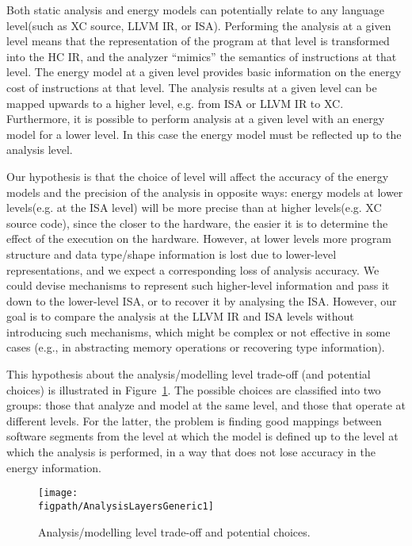 \documentclass{llncs}
\newcommand{\figpath}{./}
\newcommand{\level}{level\xspace}
\newcommand{\levels}{levels\xspace}
\newcommand{\hcir}{HC IR\xspace}
\newcommand{\llvmir}{LLVM IR\xspace}
\newcommand{\isa}{ISA\xspace}
\begin{document}
Both static analysis and energy models can potentially relate to any language \level (such as 
XC source, \llvmir, or ISA).
Performing the analysis 
at a
given \level means that 
the representation of the program at
that \level 
is transformed into the \hcir, and 
the analyzer
``mimics'' the semantics of instructions at that level.
The energy
model at a given \level provides basic information on the energy cost of instructions
at that level.
The analysis results at a given \level can be mapped upwards to
a higher level, e.g. from ISA or \llvmir to XC.
Furthermore, it is possible to perform analysis at a given level
with an energy model for a lower level. In this case the energy model
must 
be reflected up to the analysis level.

Our hypothesis is that 
the choice of \level will affect the accuracy of the energy models and
the precision of the analysis in opposite ways: energy models at lower
\levels (e.g. at the ISA \level) will be more precise than at higher
\levels (e.g. XC source code), since the closer to the hardware, the
easier it is to determine the effect of the execution on the hardware.
However, at lower \levels more program structure and data type/shape
information is lost due to lower-level representations, and we expect
a corresponding loss of analysis accuracy. 
We could devise mechanisms to represent such higher-level information
and pass it down to the lower-level \isa, or to recover it by
analysing the \isa. However, our goal is to compare the analysis at
the \llvmir and \isa \levels without introducing such mechanisms,
which might be complex or not effective in some cases (e.g., in
abstracting memory operations or recovering type information).


This hypothesis about the analysis/modelling \level trade-off (and
potential choices) is illustrated in
Figure~\ref{analysis-model-choices-overview}.
The possible choices are classified into two groups: those that
analyze and model at the same \level, and those that operate at
different \levels. For the latter, the problem is finding good
mappings between software segments from the \level at which the model
is defined up to the \level at which the analysis is performed, in a
way that does not lose accuracy in the energy information.

\begin{figure}[ht]
\centering
\centerline{\texttt{[image: \\figpath/AnalysisLayersGeneric1]}}
\vspace{-0.7cm}
\caption{Analysis/modelling \level trade-off and potential choices.}
\label{analysis-model-choices-overview}
\end{figure}
\end{document}
